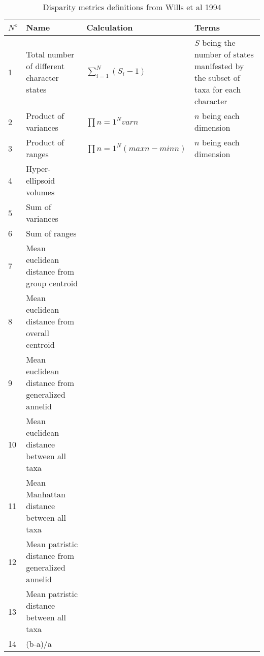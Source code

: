 \documentclass[12pt,letterpaper]{article}
\begin{document}
\begin{landscape}
\begin{table}[H]
\caption{Disparity metrics definitions from Wills et al 1994}
\centering
\begin{tabular}{p{1cm}p{5cm}p{10cm}p{10cm}}
  \hline
    $N^o$ & Name & Calculation & Terms \\ %
  \hline
  1  & Total number of different character states       & \(\sum_{i=1}^{N}{(S_{i}-1)}\) & $S$ being the number of states manifested by the subset of taxa for each character \\
  2  & Product of variances                             & \(\prod{n=1}^{N}{var{n}}\) & $n$ being each dimension \\
  3  & Product of ranges                                & \(\prod{n=1}^{N}{(max{n}-min{n})}\) & $n$ being each dimension \\
  4  & Hyper-ellipsoid volumes                          & & \\ %
  5  & Sum of variances                                 & & \\
  6  & Sum of ranges                                    & & \\
  7  & Mean euclidean distance from group centroid      & & \\
  8  & Mean euclidean distance from overall centroid    & & \\
  9  & Mean euclidean distance from generalized annelid & & \\
  10 & Mean euclidean distance between all taxa         & & \\
  11 & Mean Manhattan distance between all taxa         & & \\
  12 & Mean patristic distance from generalized annelid & & \\
  13 & Mean patristic distance between all taxa         & & \\  
  14 & (b-a)/a                                          & & \\                          
  \hline
\end{tabular}
\end{table}
\end{landscape}





\end{document}
